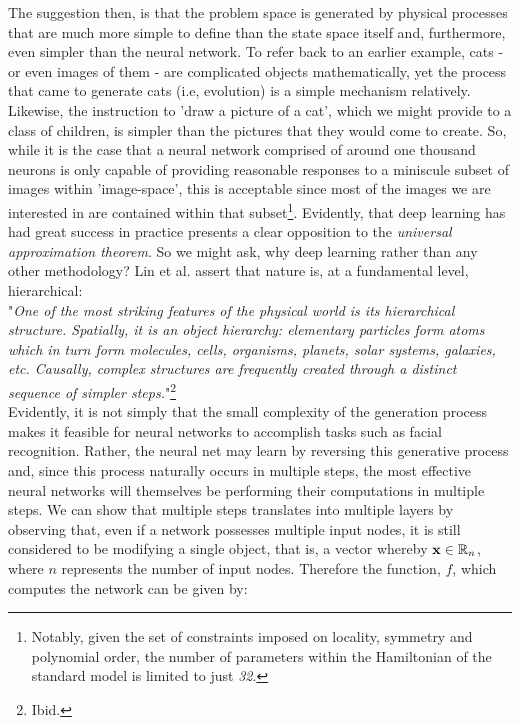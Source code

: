 \documentclass[11pt]{article}
\begin{document}
The suggestion then, is that the problem space is generated by physical processes that are much more simple to define than the state space itself and, furthermore, even simpler than the neural network. To refer back to an earlier example, cats - or even images of them - are complicated objects mathematically, yet the process that came to generate cats (i.e, evolution) is a simple mechanism relatively. Likewise, the instruction to 'draw a picture of a cat', which we might provide to a class of children, is simpler than the pictures that they would come to create. So, while it is the case that a neural network comprised of around one thousand neurons is only capable of providing reasonable responses to a miniscule subset of images within 'image-space', this is acceptable since most of the images we are interested in are contained within that subset\footnote{Notably, given the set of constraints imposed on locality, symmetry and polynomial order, the number of parameters within the Hamiltonian of the standard model is limited to just \textit{32}.}. Evidently, that deep learning has had great success in practice presents a clear opposition to the \textit{universal approximation theorem}. So we might ask, why deep learning rather than any other methodology? Lin et al. assert that nature is, at a fundamental level, hierarchical:\\

"\textit{One of the most striking features of the physical world is its hierarchical structure. Spatially, it is an object hierarchy: elementary particles form atoms which in turn form molecules, cells, organisms, planets, solar systems, galaxies, etc. Causally, complex structures are frequently created through a distinct sequence of simpler steps.}"\footnote{Ibid.}\\

Evidently, it is not simply that the small complexity of the generation process makes it feasible for neural networks to accomplish tasks such as facial recognition. Rather, the neural net may learn by reversing this generative process and, since this process naturally occurs in multiple steps, the most effective neural networks will themselves be performing their computations in multiple steps.  We can show that multiple steps translates into multiple layers by observing that, even if a network possesses multiple input nodes, it is still considered to be modifying a single object, that is, a vector whereby $\textup{\textbf{x}} \in \mathbb{R}_{n}$, where $n$ represents the number of input nodes. Therefore the function, $f$, which computes the network can be given by:
\end{document}
